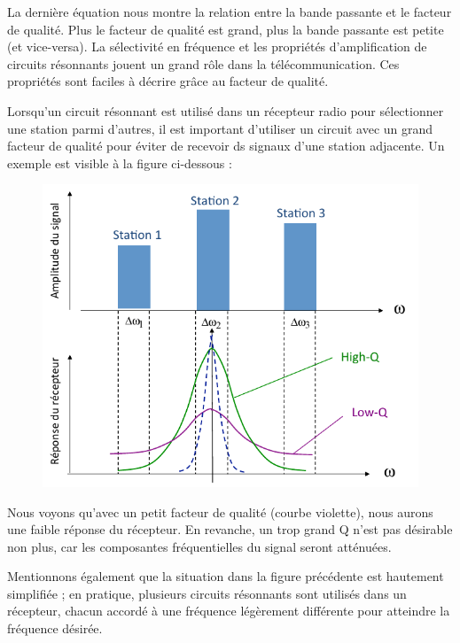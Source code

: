 \documentclass[12pt,a4paper]{article}
\begin{document}
 La dernière équation nous montre la relation entre la bande passante et le facteur de qualité. Plus le facteur de qualité est grand, plus la bande passante est petite (et vice-versa). La sélectivité en fréquence et les propriétés d'amplification de circuits résonnants jouent un grand rôle dans la télécommunication. Ces propriétés sont faciles à décrire grâce au facteur de qualité.
\begin{exemple}
	Lorsqu'un circuit résonnant est utilisé dans un récepteur radio pour sélectionner une station parmi d'autres, il est important d'utiliser un circuit avec un grand facteur de qualité pour éviter de recevoir ds signaux d'une station adjacente. Un exemple est visible à la figure ci-dessous :
\end{exemple}
\begin{figure}[!h]
	\centering
	\includegraphics[scale=0.55]{images/importance_facteur_qualite}
\end{figure}
\begin{suiteExemple}
	Nous voyons qu'avec un petit facteur de qualité (courbe violette), nous aurons une faible réponse du récepteur. En revanche, un trop grand Q n'est pas désirable non plus, car les composantes fréquentielles du signal seront atténuées.
	
	Mentionnons également que la situation dans la figure précédente est hautement simplifiée ; en pratique, plusieurs circuits résonnants sont utilisés dans un récepteur, chacun accordé à une fréquence légèrement différente pour atteindre la fréquence désirée.
\end{suiteExemple}
\end{document}
